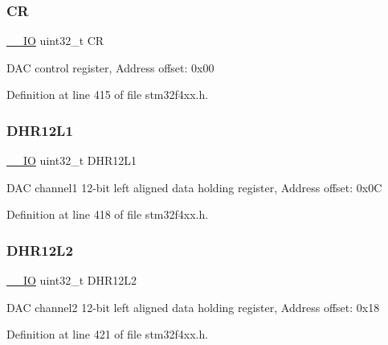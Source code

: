 \subsubsection{\texorpdfstring{CR}{CR}}
{\footnotesize\ttfamily \hyperlink{group___c_m_s_i_s__core__definitions_gaec43007d9998a0a0e01faede4133d6be}{\+\_\+\+\_\+\+IO} uint32\+\_\+t CR}

D\+AC control register, Address offset\+: 0x00 

Definition at line 415 of file stm32f4xx.\+h.

\mbox{\label{struct_d_a_c___type_def_ae9028b8bcb5118b7073165fb50fcd559}} 
\subsubsection{\texorpdfstring{D\+H\+R12\+L1}{DHR12L1}}
{\footnotesize\ttfamily \hyperlink{group___c_m_s_i_s__core__definitions_gaec43007d9998a0a0e01faede4133d6be}{\+\_\+\+\_\+\+IO} uint32\+\_\+t D\+H\+R12\+L1}

D\+AC channel1 12-\/bit left aligned data holding register, Address offset\+: 0x0C 

Definition at line 418 of file stm32f4xx.\+h.

\mbox{\label{struct_d_a_c___type_def_a2e45f9c9d67e384187b25334ba0a3e3d}} 
\subsubsection{\texorpdfstring{D\+H\+R12\+L2}{DHR12L2}}
{\footnotesize\ttfamily \hyperlink{group___c_m_s_i_s__core__definitions_gaec43007d9998a0a0e01faede4133d6be}{\+\_\+\+\_\+\+IO} uint32\+\_\+t D\+H\+R12\+L2}

D\+AC channel2 12-\/bit left aligned data holding register, Address offset\+: 0x18 

Definition at line 421 of file stm32f4xx.\+h.

\mbox{\label{struct_d_a_c___type_def_acc269320aff0a6482730224a4b641a59}} 

